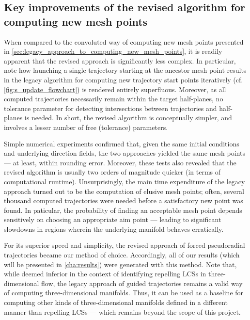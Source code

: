 \subsection{Key improvements of the revised algorithm for computing new mesh points}
\label{sub:key_improvements_of_the_revised_algorithm_for_computing_new_mesh_points}

When compared to the convoluted way of computing new mesh points presented in
\cref{sec:legacy_approach_to_computing_new_mesh_points}, it is readily apparent
that the revised approach is significantly less complex. In particular, note
how launching a single trajectory starting at the ancestor mesh point results
in the legacy algorithm for computing new trajectory start points iteratively
(cf. \cref{fig:s_update_flowchart}) is rendered entirely superfluous. Moreover,
as all computed trajectories necessarily remain within the target half-planes,
no tolerance parameter for detecting intersections between trajectories and
half-planes is needed. In short, the revised algorithm is conceptually simpler,
and involves a lesser number of free (tolerance) parameters.

Simple numerical experiments confirmed that, given the same initial
conditions and underlying direction fields, the two approaches yielded the
same mesh points --- at least, within rounding error. Moreover, these tests
also revealed that the revised algorithm is usually two orders of
magnitude quicker (in terms of computational runtime). Unsurprisingly, the
main time expenditure of the legacy approach turned out to be the computation
of elusive mesh points; often, several thousand computed trajectories were
needed before a satisfactory new point was found. In paticular, the probability
of finding an acceptable mesh point depends sensitively on choosing an
appropriate aim point --- leading to significant slowdowns in regions wherein
the underlying manifold behaves erratically.

For its superior speed and simplicity, the revised approach of forced
pseudoradial trajectories became our method of choice. Accordingly, all
of our results (which will be presented in \cref{cha:results}) were generated
with this method. Note that, while deemed inferior in the context of identifying
repelling LCSs in three-dimensional flow, the legacy approach of guided
trajectories remains a valid way of computing three-dimensional manifolds.
Thus, it can be used as a baseline for computing other kinds of
three-dimensional manifolds defined in a different manner than repelling LCSs
--- which remains beyond the scope of this project.
